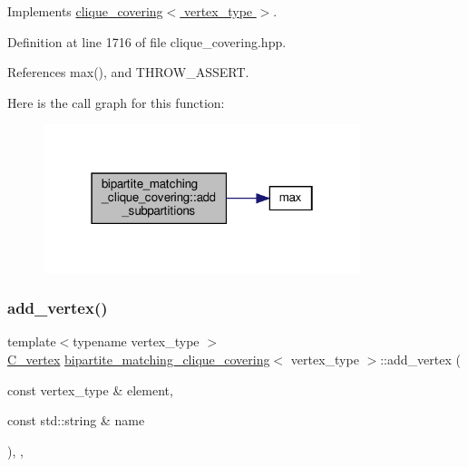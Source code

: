 Implements \hyperlink{classclique__covering_a5d40053f9ab862b4db09ec41964e0617}{clique\+\_\+covering$<$ vertex\+\_\+type $>$}.



Definition at line 1716 of file clique\+\_\+covering.\+hpp.



References max(), and T\+H\+R\+O\+W\+\_\+\+A\+S\+S\+E\+RT.

Here is the call graph for this function\+:
\nopagebreak
\begin{figure}[H]
\begin{center}
\leavevmode
\includegraphics[width=262pt]{d1/df2/classbipartite__matching__clique__covering_a25fd4df6e7216c827c3ff519350bef03_cgraph}
\end{center}
\end{figure}
\mbox{\label{classbipartite__matching__clique__covering_a78ab8166598fa7d3d6cfb9162ee07bd0}} 
\subsubsection{\texorpdfstring{add\+\_\+vertex()}{add\_vertex()}}
{\footnotesize\ttfamily template$<$typename vertex\+\_\+type $>$ \\
\hyperlink{clique__covering__graph_8hpp_a9cb45047ea8c5ed95a8cfa90494345aa}{C\+\_\+vertex} \hyperlink{classbipartite__matching__clique__covering}{bipartite\+\_\+matching\+\_\+clique\+\_\+covering}$<$ vertex\+\_\+type $>$\+::add\+\_\+vertex (\begin{DoxyParamCaption}\item[{const vertex\+\_\+type \&}]{element,  }\item[{const std\+::string \&}]{name }\end{DoxyParamCaption})\hspace{0.3cm}{\ttfamily [inline]}, {\ttfamily [override]}, {\ttfamily [virtual]}}



